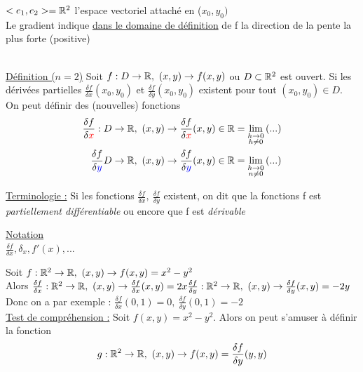 \documentclass[12pt,a4paper]{article}
\begin{document}
$<e_1,e_2> = \mathbb{R}^2$ l'espace vectoriel attaché en ($x_0,y_0)$\\
Le gradient indique \underline{dans le domaine de définition} de f la direction de la pente la plus forte (positive)\\
\\
\begin{boite}
	\underline{Définition ($n=2$)} Soit $f:D\to \mathbb{R},\ (x,y) \to f(x,y)$ ou $D\subset \mathbb{R}^2$ est ouvert. Si les dérivées partielles $\frac{\delta f}{\delta x} (x_0,y_0)$ et $\frac{\delta f}{\delta y}(x_0,y_0)$ existent pour tout $(x_0,y_0) \in D$. On peut définir des (nouvelles) fonctions
	\begin{align*}
		\frac{\delta f}{\delta \textcolor{red}{x}} : D\to \mathbb{R},\ (x,y) \to \frac{\delta f}{\delta \textcolor{red}{x}}(x,y)\in \mathbb{R} = \lim\limits_{\substack{h\to 0 \\ h\neq 0}}\left(...\right)\\
		\frac{\delta f}{\delta \textcolor{blue}{y}} D\to\mathbb{R},\ (x,y) \to \frac{\delta f}{\delta \textcolor{blue}{y}} (x,y) \in \mathbb{R} = \lim\limits_{\substack{h\to 0 \\ n\neq 0}}\left(...\right)
	\end{align*}
\end{boite}
\begin{boite}
	\underline{Terminologie :} Si les fonctions $\frac{\delta f}{\delta x},\ \frac{\delta f}{\delta y}$ existent, on dit que la fonctions f est \textit{partiellement différentiable} ou encore que f est \textit{dérivable}\\
\end{boite}
\begin{boite}
	\underline{Notation} \\
	$\frac{\delta f}{\delta x}, \delta_x, f'(x),...$
\end{boite}
 Soit $f: \mathbb{R}^2 \to \mathbb{R},\ (x,y) \to f(x,y) = x^2-y^2$\\
Alors $\frac{\delta f}{\delta x} : \mathbb{R}^2 \to \mathbb{R},\ (x,y) \to \frac{\delta f}{\delta x}(x,y) = 2x\\
\frac{\delta f}{\delta y} :  \mathbb{R}^2 \to \mathbb{R},\ (x,y) \to \frac{\delta f}{\delta y}(x,y) = -2y$\\
Donc on a par exemple : $\frac{\delta f}{\delta x} (0,1) = 0,\ \frac{\delta f}{\delta y}(0,1) = -2$\\
\underline{Test de compréhension :} Soit $f(x,y) = x^2-y^2$. Alors on peut s'amuser à définir la fonction 
\begin{equation*}
	g : \mathbb{R}^2 \to \mathbb{R},\ (x,y) \to f(x,y) = \frac{\delta f}{\delta y}(y,y)
\end{equation*}
\end{document}
